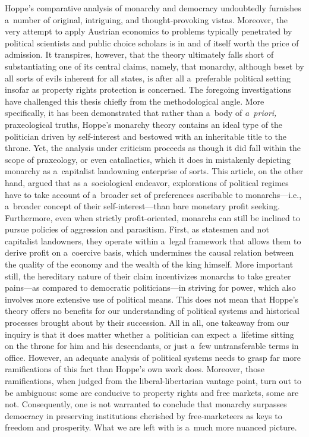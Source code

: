 Hoppe's comparative analysis of monarchy and democracy undoubtedly furnishes a~number of original, intriguing, and thought-provoking vistas. Moreover, the very attempt to apply Austrian economics to problems typically penetrated by political scientists and public choice scholars is in and of itself worth the price of admission. It transpires, however, that the theory ultimately falls short of substantiating one of its central claims, namely, that monarchy, although beset by all sorts of evils inherent for all states, is after all a~preferable political setting insofar as property rights protection is concerned. The foregoing investigations have challenged this thesis chiefly from the methodological angle. More specifically, it has been demonstrated that rather than a~body of \textit{a~priori,} praxeological truths, Hoppe's monarchy theory contains an ideal type of the politician driven by self-interest and bestowed with an inheritable title to the throne. Yet, the analysis under criticism proceeds as though it did fall within the scope of praxeology, or even catallactics, which it does in mistakenly depicting monarchy as a~capitalist landowning enterprise of sorts. This article, on the other hand, argued that as a~sociological endeavor, explorations of political regimes have to take account of a~broader set of preferences ascribable to monarchs---i.e., a~broader concept of their self-interest---than bare monetary profit seeking. Furthermore, even when strictly profit-oriented, monarchs can still be inclined to pursue policies of aggression and parasitism. First, as statesmen and not capitalist landowners, they operate within a~legal framework that allows them to derive profit on a~coercive basis, which undermines the causal relation between the quality of the economy and the wealth of the king himself. More important still, the hereditary nature of their claim incentivizes monarchs to take greater pains---as compared to democratic politicians---in striving for power, which also involves more extensive use of political means. This does not mean that Hoppe's theory offers no benefits for our understanding of political systems and historical processes brought about by their succession. All in all, one takeaway from our inquiry is that it does matter whether a~politician can expect a~lifetime sitting on the throne for him and his descendants, or just a~few untransferable terms in office. However, an adequate analysis of political systems needs to grasp far more ramifications of this fact than Hoppe's own work does. Moreover, those ramifications, when judged from the liberal-libertarian vantage point, turn out to be ambiguous: some are conducive to property rights and free markets, some are not. Consequently, one is not warranted to conclude that monarchy surpasses democracy in preserving institutions cherished by free-marketeers as keys to freedom and prosperity. What we are left with is a~much more nuanced picture.



